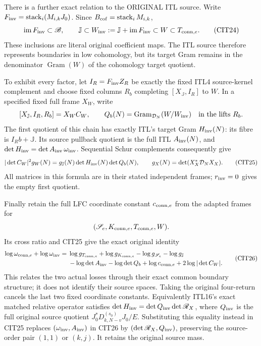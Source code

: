 \documentclass[10pt]{article}
\begin{document}
There is a further exact relation to the ORIGINAL ITL source.
Write $F_{\rm inv}=\operatorname{stack}_i(M_{i,k}J_0)$.
Since $B_{\rm cof}=\operatorname{stack}_iM_{i,k}$,
\[
 \operatorname{im}F_{\rm inv}\subset\mathscr B,\qquad
 \mathbb J\subset
 W_{\rm inv}:=\mathbb J+\operatorname{im}F_{\rm inv}
          \subset W\subset T_{{\rm conn},e}.
 \tag{CIT24}
\]
These inclusions are literal original coefficient maps.
The ITL source therefore represents boundaries in low
cohomology, but its target Gram remains in the denominator
$\operatorname{Gram}(W)$ of the cohomology target quotient.

To exhibit every factor, let $I_R=F_{\rm inv}Z_R$ be exactly
the fixed ITL4 source-kernel complement and choose fixed
columns $R_b$ completing $[X_{\mathbb J},I_R]$ to $W$.
In a specified fixed full frame $X_W$, write
\[
 [X_{\mathbb J},I_R,R_b]=X_W C_W,\qquad
 Q_b(N)=\operatorname{Gram}_{\mathcal D_N}(W/W_{\rm inv})
                     \quad\hbox{in the lifts }R_b .
\]
The first quotient of this chain has exactly ITL's target
Gram $H_{\rm inv}(N)$: its fibre is $I_Rb+\mathbb J$.
Its source pullback quotient is the full ITL $A_{\rm inv}(N)$,
and $\det H_{\rm inv}=\det A_{\rm inv}\,\omega_{\rm inv}$.
Sequential Schur complements consequently give
\[
 |\det C_W|^2 g_W(N)
  =g_{\mathbb J}(N)\det H_{\rm inv}(N)\det Q_b(N),
 \qquad g_X(N)=\det(X_X^*\mathcal D_NX_X).
 \tag{CIT25}
\]
All matrices in this formula are in their stated independent
frames; $r_{\rm inv}=0$ gives the empty first quotient.

Finally retain the full LFC coordinate constant $c_{{\rm conn},e}$
from the adapted frames for
\[
 (\mathscr S_e,K_{{\rm conn},e},T_{{\rm conn},e},W).
\]
Its cross ratio and CIT25 give the exact original identity
\[
 \begin{split}
 \log\omega_{{\rm conn},e}+\log\omega_{\rm inv}
  ={}&\log g_{T_{{\rm conn},e}}+\log g_{K_{{\rm conn},e}}
       -\log g_{\mathscr S_e}-\log g_{\mathbb J}\\
    &-\log\det A_{\rm inv}-\log\det Q_b
       +\log c_{{\rm conn},e}+2\log|\det C_W| .
 \end{split}\tag{CIT26}
\]
This relates the two actual losses through their exact common
boundary structure; it does not identify their source spaces.
Taking the original four-return cancels the last two fixed
coordinate constants. Equivalently ITL16's exact matched
relative operator satisfies
$\det H_{\rm inv}=\det Q_{\rm inv}\det\mathscr R_{X}$,
where $Q_{\rm inv}$ is the full original source quotient
$J_0^*D_{k,N-v}^{(s_0)}J_0/E$. Substituting this equality
instead in CIT25 replaces
$(\omega_{\rm inv},A_{\rm inv})$ in CIT26 by
$(\det\mathscr R_X,Q_{\rm inv})$, preserving the source-order
pair $(1,1)$ or $(k,j)$. It retains the original source mass.
\end{document}
